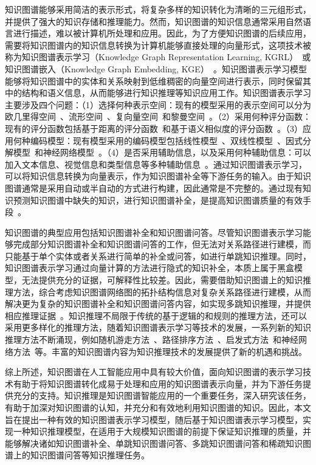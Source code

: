 \documentclass[algorithmlist, AutoFakeBold, AutoFakeSlant, figurelist, tablelist, nomlist, masters]{seuthesix}
\begin{document}
知识图谱能够采用简洁的表示形式，将复杂多样的知识转化为清晰的三元组形式，并提供了强大的知识存储和推理能力。然而，知识图谱的知识信息通常采用自然语言进行描述，难以被计算机所处理和应用。因此，为了方便知识图谱的后续应用，需要将知识图谱内的知识信息转换为计算机能够直接处理的向量形式，这项技术被称为知识图谱表示学习（Knowledge Graph Representation Learning, KGRL）~\cite{chen2022rlpath}或知识图谱嵌入（Knowledge Graph Embedding, KGE）~\cite{wang2021transet}。知识图谱表示学习模型能够将知识图谱中的实体和关系映射到低维稠密的向量空间进行表示，同时保留其中的结构和语义信息，从而能够进行知识推理等知识应用工作。知识图谱表示学习主要涉及四个问题：（1）选择何种表示空间：现有的模型采用的表示空间可以分为欧几里得空间~\cite{lu2022dense}、流形空间~\cite{ebisu2018toruse}、复向量空间~\cite{trouillon2016complex}和黎曼空间~\cite{pan2021hyperbolic}。（2）采用何种评分函数：现有的评分函数包括基于距离的评分函数~\cite{sachan2020knowledge}和基于语义相似度的评分函数~\cite{xiao2017ssp}。（3）应用何种编码模型：现有模型采用的编码模型包括线性模型~\cite{peng2020lineare}、双线性模型~\cite{pan2021hyperbolic}、因式分解模型~\cite{ji2015knowledge}和神经网络模型~\cite{jiang2021kernel}。（4）是否采用辅助信息，以及采用何种辅助信息：可以加入文本信息、视觉信息和类型信息等多种辅助信息~\cite{wang2017knowledge}。通过知识图谱表示学习，可以将知识信息转换为向量表示，作为知识图谱补全等下游任务的输入。由于知识图谱通常是采用自动或半自动的方式进行构建，因此通常是不完整的。通过现有知识预测知识图谱中缺失的知识，进行知识图谱补全，是提高知识图谱质量的有效手段~\cite{vu2019capsule}。

知识图谱的典型应用包括知识图谱补全和知识图谱问答。尽管知识图谱表示学习能够完成部分知识图谱补全和知识图谱问答的工作，但无法对关系路径进行建模，而只能基于单个实体或者关系进行简单的补全或问答，如进行单跳知识推理。同时，知识图谱表示学习通过向量计算的方法进行隐式的知识补全，本质上属于黑盒模型，无法提供充分的证据，可解释性比较差。因此，需要借助知识图谱上的知识推理方法，综合考虑知识图谱网络图的拓扑结构信息对复杂关系路径进行建模，从而解决更为复杂的知识图谱补全和知识图谱问答内容，如实现多跳知识推理，并提供相应推理证据~\cite{chen2020review}。知识推理不局限于传统的基于逻辑的和规则的推理方法，还可以采用更多样化的推理方法，随着知识图谱表示学习等技术的发展，一系列新的知识推理方法不断涌现，例如随机游走方法~\cite{jagvaral2020path}、路径排序方法~\cite{zhao2021target}、启发式方法~\cite{he2021heuristic}和神经网络方法~\cite{wang2018deep}等。丰富的知识图谱内容为知识推理技术的发展提供了新的机遇和挑战。

综上所述，知识图谱在人工智能应用中具有较大价值，面向知识图谱的表示学习技术有助于将知识图谱转化成易于处理和应用的知识图谱表示向量，并为下游任务提供充分的支持。知识推理是知识图谱智能应用的一个重要任务，深入研究该任务，有助于加深对知识图谱的认知，并充分和有效地利用知识图谱的知识。因此，本文旨在提出一种有效的知识图谱表示学习模型，随后基于知识图谱表示学习模型，实现一种知识推理模型，在适用于大规模知识图谱的前提下保证知识推理的质量，并能够解决诸如知识图谱补全、单跳知识图谱问答、多跳知识图谱问答和稀疏知识图谱上的知识图谱问答等知识推理任务。
\end{document}
